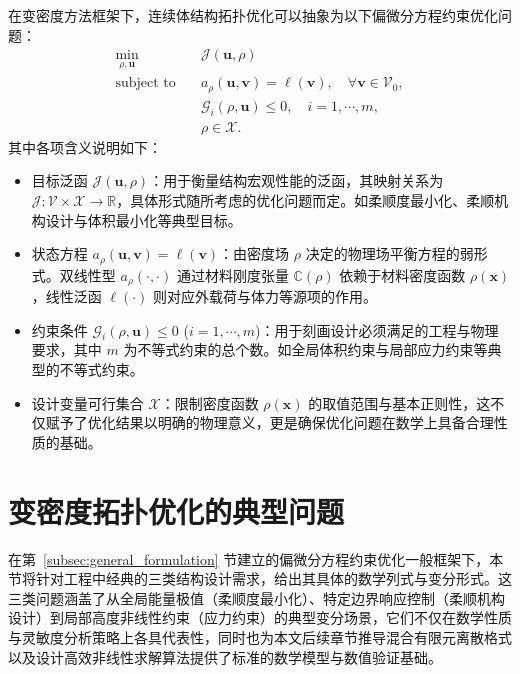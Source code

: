 在变密度方法框架下，连续体结构拓扑优化可以抽象为以下偏微分方程约束优化问题：
\begin{equation} \label{eq:ch6_general_topology_optimization}
	\begin{aligned}
		\min_{\rho,\boldsymbol{u}}\quad&\mathcal{J}(\boldsymbol{u}, \rho)\\
		\text{subject~to}\quad&
		a_\rho(\boldsymbol{u},\boldsymbol{v}) = \ell(\boldsymbol{v}),\quad\forall\boldsymbol{v}\in\mathcal{V}_0,\\
		&\mathcal{G}_i(\rho,\boldsymbol{u})\leq0,\quad{i}=1,\cdots,m,\\
		&\rho\in\mathcal{X}.
	\end{aligned}
\end{equation}
其中各项含义说明如下：
\begin{itemize}
	\item 目标泛函 $\mathcal{J}(\boldsymbol{u}, \rho)$：用于衡量结构宏观性能的泛函，其映射关系为 $\mathcal{J}:\mathcal{V}\times\mathcal{X}\to\mathbb{R}$，具体形式随所考虑的优化问题而定。如柔顺度最小化、柔顺机构设计与体积最小化等典型目标。

	\item 状态方程 $a_\rho(\boldsymbol{u},\boldsymbol{v}) = \ell(\boldsymbol{v})$：由密度场 $\rho$ 决定的物理场平衡方程的弱形式。双线性型 $a_\rho(\cdot,\cdot)$ 通过材料刚度张量 $\mathbb{C}(\rho)$ 依赖于材料密度函数 $\rho(\boldsymbol{x})$，线性泛函 $\ell(\cdot)$ 则对应外载荷与体力等源项的作用。
	
	\item 约束条件 $\mathcal{G}_i(\rho,\boldsymbol{u})\leq 0$ ($i=1,\cdots,m$)：用于刻画设计必须满足的工程与物理要求，其中 $m$ 为不等式约束的总个数。如全局体积约束与局部应力约束等典型的不等式约束。
	
	\item 设计变量可行集合 $\mathcal{X}$：限制密度函数 $\rho(\boldsymbol{x})$ 的取值范围与基本正则性，这不仅赋予了优化结果以明确的物理意义，更是确保优化问题在数学上具备合理性质的基础。
\end{itemize}


\section{变密度拓扑优化的典型问题}
\label{sec:typical_problems}

在第~\ref{subsec:general_formulation} 节建立的偏微分方程约束优化一般框架下，本节将针对工程中经典的三类结构设计需求，给出其具体的数学列式与变分形式。这三类问题涵盖了从全局能量极值（柔顺度最小化）、特定边界响应控制（柔顺机构设计）到局部高度非线性约束（应力约束）的典型变分场景，它们不仅在数学性质与灵敏度分析策略上各具代表性，同时也为本文后续章节推导混合有限元离散格式以及设计高效非线性求解算法提供了标准的数学模型与数值验证基础。


